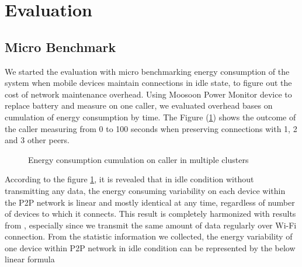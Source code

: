 \documentclass[conference]{IEEEtran}
\begin{document}
\section{Evaluation}
\label{sec:eval}

\subsection{Micro Benchmark}
We started the evaluation with micro benchmarking energy consumption of the system when mobile devices maintain connections in idle state, to figure out the cost of network maintenance overhead. Using Moosoon Power Monitor device \cite{moosoon} to replace battery and measure on one caller, we evaluated overhead bases on cumulation of energy consumption by time. The Figure (\ref{fig:microb_24}) shows the outcome of the caller measuring from 0 to 100 seconds when preserving connections with 1, 2 and 3 other peers. 

\begin{figure}[H]
	\hspace*{-0.15cm}
	\caption{Energy consumption cumulation on caller in multiple clusters}
	\label{fig:microb_24}
\end{figure}

According to the figure \ref{fig:microb_24}, it is revealed that in idle condition without transmitting any data, the energy consuming variability on each device within the P2P network is linear and mostly identical at any time, regardless of number of devices to which it connects. This result is completely harmonized with results from \cite{wifi_energy}, especially since we transmit the same amount of data regularly over Wi-Fi connection. From the statistic information we collected, the energy variability of one device within P2P network in idle condition can be represented by the below linear formula
\end{document}
